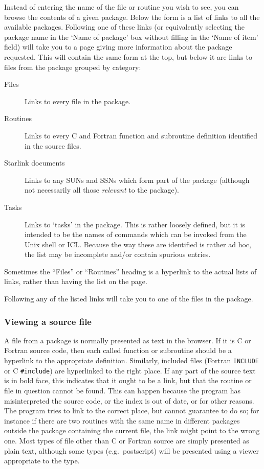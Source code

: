 \documentclass[twoside,11pt]{article}
\newcommand{\xlabel}[1]{}
\renewcommand{\_}{\texttt{\symbol{95}}}
\begin{document}
Instead of entering the name of the file or routine you wish to
see, you can browse the contents of a given package.
Below the form is a list of links to all the available packages.
Following one of these links (or equivalently selecting the package
name in the `Name of package' box without filling in the `Name of item'
field) will take you to a page giving more information about the 
package requested.
This will contain the same form at the top, 
but below it are links to files from the package grouped by category:
\begin{description}
\item[Files]
Links to every file in the package.
\item[Routines]
Links to every C and Fortran function and subroutine definition 
identified in the source files.
\item[Starlink documents]
Links to any SUNs and SSNs which form part of the package
(although not necessarily all those {\it relevant\/} to the package).
\item[Tasks]
Links to `tasks' in the package.
This is rather loosely defined, but it is intended to be
the names of commands which can be invoked from the Unix shell or ICL.
Because the way these are identified is rather ad hoc,
the list may be incomplete and/or contain spurious entries.
\end{description}
Sometimes the ``Files'' or ``Routines'' heading is a hyperlink to 
the actual lists of links, rather than having the list on the page.

Following any of the listed links 
will take you to one of the files in the package.

\subsubsection{\xlabel{sec:view}\label{sec:view}Viewing a source file}

A file from a package is normally presented as text in the browser.
If it is C or Fortran source code, then each called function or
subroutine should be a hyperlink to the appropriate definition.
Similarly, included files (Fortran {\tt INCLUDE} or C {\tt \#include}) 
are hyperlinked to the right place.
If any part of the source text is in bold face,
this indicates that it ought to be a link,
but that the routine or file in question cannot be found. 
This can happen because the program has misinterpreted the source code,
or the index is out of date, or for other reasons.
The program tries to link to the correct place, 
but cannot guarantee to do so; for instance if there are two 
routines with the same name in different packages outside the
package containing the current file, the link might point to
the wrong one.
Most types of file other than C or Fortran source are 
simply presented as plain text, although some types
(e.g.\ postscript)
will be presented using a viewer appropriate to the type.
\end{document}

